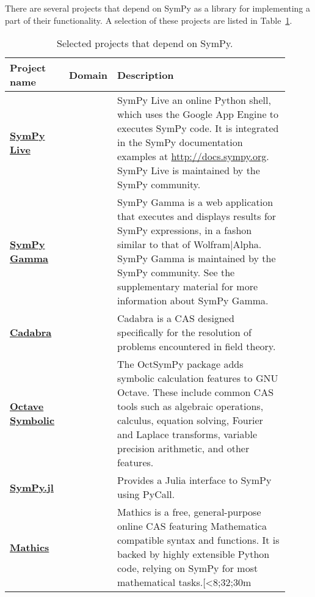 There are several projects that depend on SymPy as a library for implementing
a part of their functionality. A selection of these projects are listed in
Table~\ref{projects-table}.

\begin{longtable}[htbc]{>{\raggedright}p{0.14\linewidth}p{0.14\linewidth}p{0.63\linewidth}}
\caption{Selected projects that depend on SymPy.\label{projects-table}}\\
\toprule
\textbf{Project name} & \textbf{Domain} & \textbf{Description} \\
\midrule
\href{http://live.sympy.org/}{\textbf{SymPy Live}} &  & SymPy Live an online
  Python shell, which uses the Google App Engine to executes SymPy code. It is
  integrated in the SymPy documentation examples at
  \href{http://docs.sympy.org}{http://docs.sympy.org}. SymPy Live is
  maintained by the SymPy community. \\

\href{http://sympygamma.com/}{\textbf{SymPy Gamma}} &  & SymPy Gamma is a
  web application that executes and displays results for SymPy expressions, in
  a fashon similar to that of Wolfram|Alpha. SymPy Gamma is maintained by the
  SymPy community. See the supplementary material for more information about
  SymPy Gamma. \\

\href{http://cadabra.science/index.html}{\textbf{Cadabra}}~\cite{Peeters2007cadabra} &  &
  Cadabra is a CAS designed specifically for the resolution of problems
  encountered in field theory. \\

\href{http://octave.sourceforge.net/symbolic}{\textbf{Octave Symbolic}}~\cite{OctSymPy} &  &
  The OctSymPy package adds symbolic calculation features
  to GNU Octave. These include common CAS tools such
  as algebraic operations, calculus, equation solving, Fourier and
  Laplace transforms, variable precision arithmetic, and other features. \\

\href{https://github.com/jverzani/SymPy.jl}{\textbf{SymPy.jl}}~\cite{SymPy.jl} &  &
  Provides a Julia interface to SymPy using PyCall. \\

\href{https://mathics.github.io/}{\textbf{Mathics}}~\cite{Mathics} &  & Mathics is a
  free, general-purpose online CAS featuring Mathematica compatible
  syntax and functions. It is backed by highly extensible Python code,
  relying on SymPy for most mathematical tasks.[<8;32;30m \\


\end{longtable}

